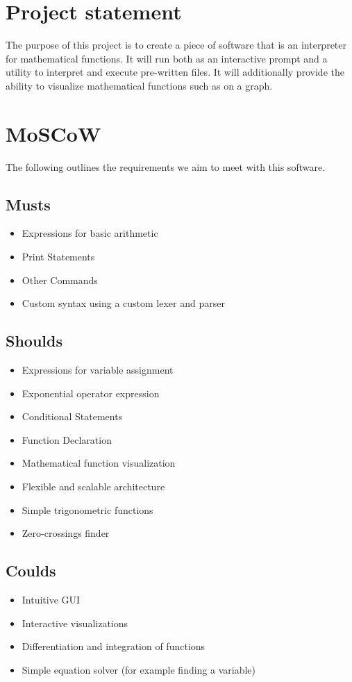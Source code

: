 \documentclass[a4paper, oneside, 11pt]{report}
\begin{document}
\section{Project statement}
The purpose of this project is to create a piece of software that is an interpreter for mathematical functions. It will run both as an interactive prompt and a utility to interpret and execute pre-written files.
It will additionally provide the ability to visualize mathematical functions such as on a graph.

\section{MoSCoW}
The following outlines the requirements we aim to meet with this software.

\subsection{Musts}

\begin{itemize}
	\item Expressions for basic arithmetic
	\item Print Statements
	\item Other Commands
	\item Custom syntax using a custom lexer and parser
\end{itemize}

\subsection{Shoulds}

\begin{itemize}
	\item Expressions for variable assignment
	\item Exponential operator expression
	\item Conditional Statements
	\item Function Declaration
	\item Mathematical function visualization
	\item Flexible and scalable architecture
	\item Simple trigonometric functions
	\item Zero-crossings finder
\end{itemize}

\subsection{Coulds}
\begin{itemize}
	\item Intuitive GUI
	\item Interactive visualizations
	\item Differentiation and integration of functions
	\item Simple equation solver (for example finding a variable)
\end{itemize}
\end{document}
